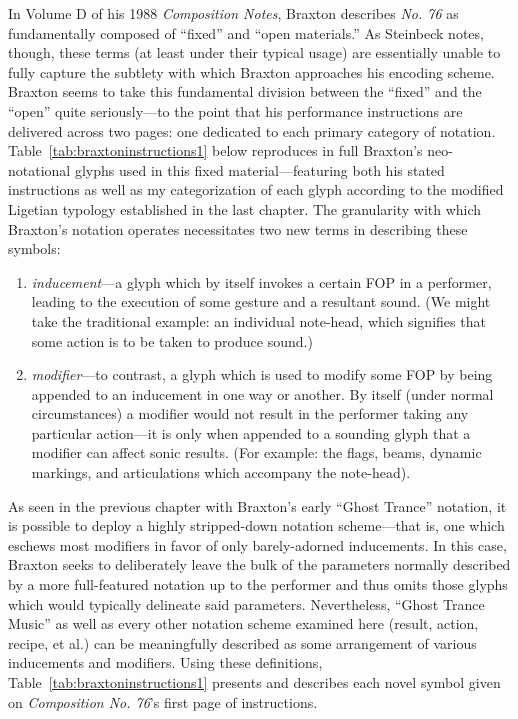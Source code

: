         In Volume D of his 1988 \textit{Composition Notes}, Braxton describes \textit{No. 76} as fundamentally composed of ``fixed'' and ``open materials.'' As Steinbeck notes, though, these terms (at least under their typical usage) are essentially unable to fully capture the subtlety with which Braxton approaches his encoding scheme.\autocite[254]{Steinbeck_2018} Braxton seems to take this fundamental division between the ``fixed'' and the ``open'' quite seriously---to the point that his performance instructions are delivered across two pages: one dedicated to each primary category of notation. Table~\ref{tab:braxtoninstructions1} below reproduces in full Braxton's neo-notational glyphs used in this fixed material---featuring both his stated instructions as well as my categorization of each glyph according to the modified Ligetian typology established in the last chapter. The granularity with which Braxton's notation operates necessitates two new terms in describing these symbols: 
        
            \begin{smallquote}
                \begin{enumerate}
                    \item \textit{inducement}---a glyph which by itself invokes a certain FOP in a performer, leading to the execution of some gesture and a resultant sound. (We might take the traditional example: an individual note-head, which signifies that some action is to be taken to produce sound.)
                    \item \textit{modifier}---to contrast, a glyph which is used to modify some FOP by being appended to an inducement in one way or another. By itself (under normal circumstances) a modifier would not result in the performer taking any particular action---it is only when appended to a sounding glyph that a modifier can affect sonic results. (For example: the flags, beams, dynamic markings, and articulations which accompany the note-head).
                \end{enumerate}
            \end{smallquote}
       
        As seen in the previous chapter with Braxton's early ``Ghost Trance'' notation, it is possible to deploy a highly stripped-down notation scheme---that is, one which eschews most modifiers in favor of only barely-adorned inducements. In this case, Braxton seeks to deliberately leave the bulk of the parameters normally described by a more full-featured notation up to the performer and thus omits those glyphs which would typically delineate said parameters. Nevertheless, ``Ghost Trance Music'' as well as every other notation scheme examined here (result, action, recipe, et al.) can be meaningfully described as some arrangement of various inducements and modifiers. Using these definitions, Table~\ref{tab:braxtoninstructions1} presents and describes each novel symbol given on \textit{Composition No. 76}'s first page of instructions. 
        
